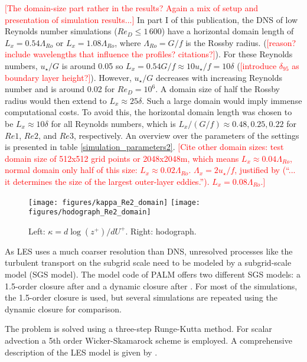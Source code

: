 \documentclass[a4paper,11pt]{article}
\newcommand{\todo}[1]{\textcolor{red}{$[$#1$]$}}
\begin{document}
\todo{The domain-size part rather in the results? Again a mix of setup and presentation of simulation results...} In part I of this publication, the DNS of low Reynolds number simulations ($Re_D\leq1\,600$) have a horizontal domain length of $L_x = 0.54\Lambda_{Ro}$ or $L_x = 1.08\Lambda_{Ro}$, where $\Lambda_{Ro}=G/f$ is the Rossby radius. (\todo{reason? include wavelengths that influence the profiles? citations?}). For these Reynolds numbers, $u_\star/G$ is around 0.05 so $L_x = 0.54G/f \approx 10 u_\star/f = 10 \delta$ (\todo{introduce $\delta_{95}$ as boundary layer height?}). However, $u_\star/G$ decreases with increasing Reynolds number and is around 0.02 for $Re_D=10^6$. A domain size of half the Rossby radius would then extend to $L_x\approx 25\delta$. Such a large domain would imply immense computational costs. To avoid this, the horizontal domain length was chosen to be $L_x\approx10\delta$ for all Reynolds numbers, which is $L_x/(G/f)\approx 0.48, 0.25,0.22$ for $Re1$, $Re2$, and $Re3$, respectively. An overview over the parameters of the settings is presented in table \ref{simulation_parameters2}.
\todo{Cite other domain sizes: \cite{jiang2018large} test domain size of 512x512 grid points or 2048x2048m, which means $L_x \approx 0.04\Lambda_{Ro}$, normal domain only half of this size:  $L_x \approx 0.02\Lambda_{Ro}$. \cite{spalart2008direct} $\Lambda_x = 2u_\star/f$, justified by \cite{csanady1967resistance} (``... it determines the size of the largest outer-layer
eddies.''). \cite{esau2004simulation} $L_x = 0.08\Lambda_{Ro}$.}

\begin{figure}
  \centerline{
	\texttt{[image: figures/kappa\_Re2\_domain]}
	\texttt{[image: figures/hodograph\_Re2\_domain]}
}
  \caption{Left: $\kappa=d\log(z^+)/dU^+$. Right: hodograph.}
  \label{domain}
\end{figure}

As LES uses a much coarser resolution than DNS, unresolved processes like the turbulent transport on the subgrid scale need to be modeled by a subgrid-scale model (SGS model). The model code of PALM offers two different SGS models: a 1.5-order closure after \cite{deardorff1980stratocumulus} and a dynamic closure after \cite{heinz2008realizability}. For most of the simulations, the 1.5-order closure is used, but several simulations are repeated using the dynamic closure for comparison.

The problem is solved using a three-step Runge-Kutta method. For scalar advection a 5th order Wicker-Skamarock scheme is employed. A comprehensive description of the LES model is given by \cite{maronga2020overview}.
\end{document}
